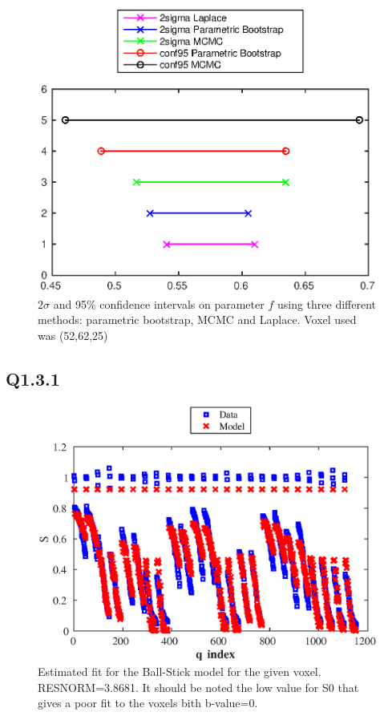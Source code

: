 \documentclass[11pt,a4paper,oneside]{report}
\begin{document}
\begin{figure}[H]
      \centering
    \includegraphics[scale=1]{figures/q2/q123-p3.eps}
    \caption{$2\sigma$ and 95\% confidence intervals on parameter $f$ using three different methods: parametric bootstrap, MCMC and Laplace. Voxel used was (52,62,25) }
    \label{q123-p3}
\end{figure}

\subsection*{Q1.3.1}

\begin{figure}[H]
\centering
\includegraphics[scale=0.8]{figures/q3/q131.eps}
\caption{Estimated fit for the Ball-Stick model for the given voxel. RESNORM=3.8681. It should be noted the low value for S0 that gives a poor fit to the voxels bith b-value=0.}
\label{q131}
\end{figure}
\end{document}
